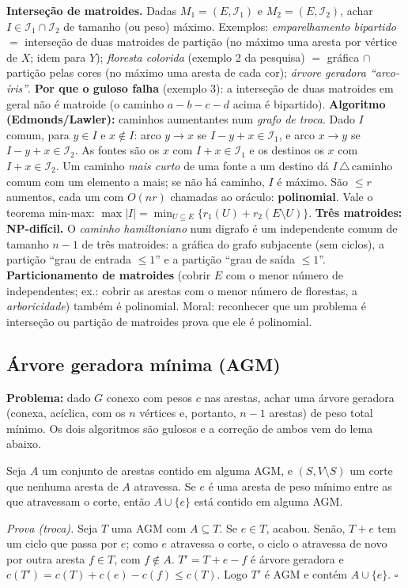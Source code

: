\begin{complemento}
\textbf{Interseção de matroides.} Dadas $M_1=(E,\mathcal I_1)$ e $M_2=(E,\mathcal I_2)$, achar $I\in\mathcal I_1\cap\mathcal I_2$ de tamanho (ou peso) máximo. Exemplos: \emph{emparelhamento bipartido} $=$ interseção de duas matroides de partição (no máximo uma aresta por vértice de $X$; idem para $Y$); \emph{floresta colorida} (exemplo 2 da pesquisa) $=$ gráfica $\cap$ partição pelas cores (no máximo uma aresta de cada cor); \emph{árvore geradora ``arco-íris''}.
\textbf{Por que o guloso falha} (exemplo 3): a interseção de duas matroides em geral não é matroide (o caminho $a\!-\!b\!-\!c\!-\!d$ acima é bipartido).
\textbf{Algoritmo (Edmonds/Lawler):} caminhos aumentantes num \emph{grafo de troca}. Dado $I$ comum, para $y\in I$ e $x\notin I$: arco $y\to x$ se $I-y+x\in\mathcal I_1$, e arco $x\to y$ se $I-y+x\in\mathcal I_2$. As fontes são os $x$ com $I+x\in\mathcal I_1$ e os destinos os $x$ com $I+x\in\mathcal I_2$. Um caminho \emph{mais curto} de uma fonte a um destino dá $I\,\triangle\,\text{caminho}$ comum com um elemento a mais; se não há caminho, $I$ é máximo. São $\le r$ aumentos, cada um com $O(nr)$ chamadas ao oráculo: \textbf{polinomial}. Vale o teorema min-max: $\max|I|=\min_{U\subseteq E}\{r_1(U)+r_2(E\setminus U)\}$.
\textbf{Três matroides: NP-difícil.} O \emph{caminho hamiltoniano} num digrafo é um independente comum de tamanho $n-1$ de três matroides: a gráfica do grafo subjacente (sem ciclos), a partição ``grau de entrada $\le1$'' e a partição ``grau de saída $\le1$''.
\textbf{Particionamento de matroides} (cobrir $E$ com o menor número de independentes; ex.: cobrir as arestas com o menor número de florestas, a \emph{arboricidade}) também é polinomial. Moral: reconhecer que um problema é interseção ou partição de matroides prova que ele é polinomial.
\end{complemento}

\subsection{Árvore geradora mínima (AGM)}\label{sec:agm}
\textbf{Problema:} dado $G$ conexo com pesos $c$ nas arestas, achar uma árvore geradora (conexa, acíclica, com os $n$ vértices e, portanto, $n-1$ arestas) de peso total mínimo. Os dois algoritmos são gulosos e a correção de ambos vem do lema abaixo.
\begin{lema}\label{lema:corte}
Seja $A$ um conjunto de arestas contido em alguma AGM, e $(S,V\setminus S)$ um corte que nenhuma aresta de $A$ atravessa. Se $e$ é uma aresta de peso mínimo entre as que atravessam o corte, então $A\cup\{e\}$ está contido em alguma AGM.
\end{lema}
\emph{Prova (troca).} Seja $T$ uma AGM com $A\subseteq T$. Se $e\in T$, acabou. Senão, $T+e$ tem um ciclo que passa por $e$; como $e$ atravessa o corte, o ciclo o atravessa de novo por outra aresta $f\in T$, com $f\notin A$. $T'=T+e-f$ é árvore geradora e $c(T')=c(T)+c(e)-c(f)\le c(T)$. Logo $T'$ é AGM e contém $A\cup\{e\}$. $\square$

